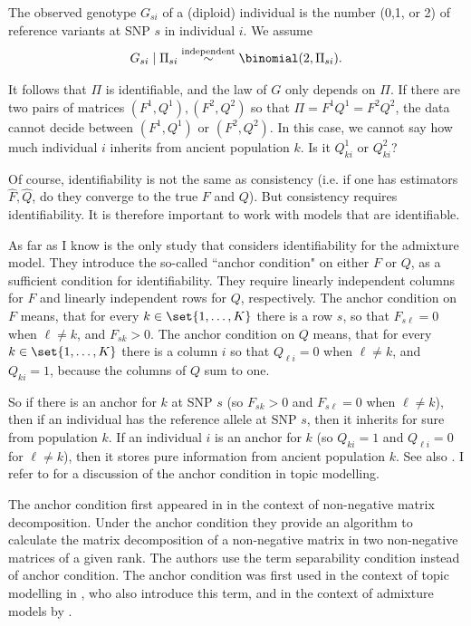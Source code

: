 \documentclass[12pt,a4paper]{article}
\begin{document}
The observed genotype $G_{si}$ of a (diploid) individual is the number (0,1, or 2) of reference variants at SNP $s$ in individual $i$. We assume \begin{equation}\label{eq:admixturemodel}
G_{si}\mid \Pi_{si}\stackrel{\text{independent}}\sim \binomial(2,\Pi_{si}). 
\end{equation}  


It follows that $\Pi$ is identifiable, and the law of $G$ only depends on $\Pi$. %
If there are two pairs of matrices $(F^1,Q^1),(F^2,Q^2)$ so that $\Pi=F^1Q^1=F^2Q^2$, the data cannot decide between $(F^1,Q^1)$ or $(F^2,Q^2)$.  In this case, we cannot say how much individual $i$ inherits from ancient population $k$. Is it $Q_{ki}^1$ or $Q_{ki}^2$?

 
Of course, identifiability is not the same as consistency (i.e. if one has estimators $\hat F,\hat Q$, do they converge to the true $F$ and $Q$). But consistency requires identifiability. It is therefore important to work with models that are identifiable. 


As far as I know \cite{CabrerosStorey2019} is the only study that considers identifiability for the admixture model. They introduce the so-called ``anchor condition" on either $F$ or $Q$, as a sufficient condition for identifiability. They require linearly independent columns for $F$ and linearly independent rows for $Q$, respectively. The anchor condition on $F$ means, that for every  $k\in\set{1,\ldots,K}$ there is a row $s$, so that $F_{s\ell}=0$ when $\ell\neq k$, and $F_{sk}>0$. The anchor condition on $Q$ means, that for every $k\in \set{1,\ldots,K}$ there is a column $i$ so that $Q_{\ell i}=0$ when $\ell\neq k$, and $Q_{ki}=1$, because the columns of $Q$ sum to one. 

So if there is an anchor for $k$ at SNP $s$ (so $F_{sk}>0$ and $F_{s\ell}=0$ when $\ell\neq k$), then if an individual has the reference allele at SNP $s$, then it inherits for sure from population $k$. If an individual $i$ is an anchor for $k$ (so $Q_{ki}=1$ and $Q_{\ell i}=0$ for $\ell\neq k$), then it stores pure information from ancient population $k$.  See also \cite[page 1014]{CabrerosStorey2019}. I refer to \cite[page 2]{Aroraea2013} for a discussion of the anchor condition in topic modelling.

The anchor condition first appeared in \cite{DonohoStodden2004} in the context of non-negative matrix decomposition. Under the anchor condition they provide an algorithm to calculate the matrix decomposition of a non-negative matrix in two non-negative matrices of a given rank. The authors use the term separability condition instead of anchor condition. The anchor condition was first used in the context of topic modelling in \cite{Aroraea2012}, who also introduce this term, and in the context of admixture models by \cite{CabrerosStorey2019}.
\end{document}
